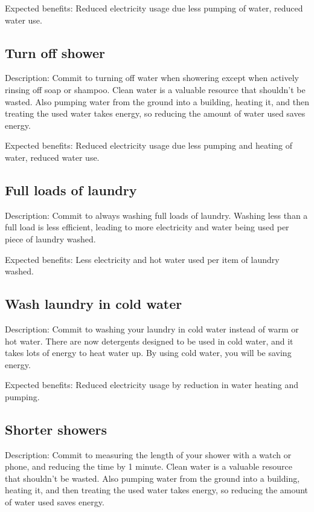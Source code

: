 Expected benefits: Reduced electricity usage due less pumping of water, reduced water use.


\subsection{Turn off shower}

Description: Commit to turning off water when showering except when actively rinsing off soap or shampoo. Clean water is a valuable resource that shouldn't be wasted. Also pumping water from the ground into a building, heating it, and then treating the used water takes energy, so reducing the amount of water used saves energy.

Expected benefits: Reduced electricity usage due less pumping and heating of water, reduced water use.


\subsection{Full loads of laundry}

Description: Commit to always washing full loads of laundry. Washing less than a full load is less efficient, leading to more electricity and water being used per piece of laundry washed.

Expected benefits: Less electricity and hot water used per item of laundry washed.


\subsection{Wash laundry in cold water}

Description: Commit to washing your laundry in cold water instead of warm or hot water. There are now detergents designed to be used in cold water, and it takes lots of energy to heat water up. By using cold water, you will be saving energy.

Expected benefits: Reduced electricity usage by reduction in water heating and pumping.


\subsection{Shorter showers}

Description: Commit to measuring the length of your shower with a watch or phone, and reducing the time by 1 minute. Clean water is a valuable resource that shouldn't be wasted. Also pumping water from the ground into a building, heating it, and then treating the used water takes energy, so reducing the amount of water used saves energy.

